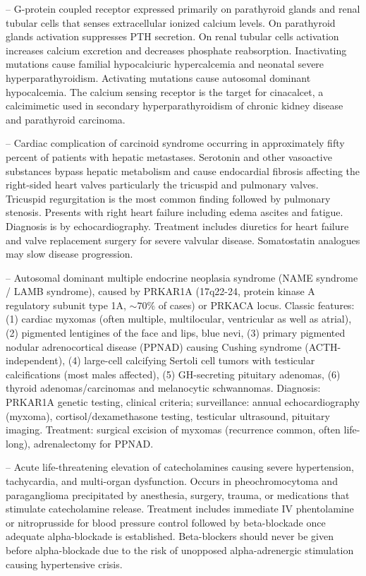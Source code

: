 -- G-protein coupled receptor expressed primarily on parathyroid glands and renal tubular cells that senses extracellular ionized calcium levels. On parathyroid glands activation suppresses PTH secretion. On renal tubular cells activation increases calcium excretion and decreases phosphate reabsorption. Inactivating mutations cause familial hypocalciuric hypercalcemia and neonatal severe hyperparathyroidism. Activating mutations cause autosomal dominant hypocalcemia. The calcium sensing receptor is the target for cinacalcet, a calcimimetic used in secondary hyperparathyroidism of chronic kidney disease and parathyroid carcinoma.

-- Cardiac complication of carcinoid syndrome occurring in approximately fifty percent of patients with hepatic metastases. Serotonin and other vasoactive substances bypass hepatic metabolism and cause endocardial fibrosis affecting the right-sided heart valves particularly the tricuspid and pulmonary valves. Tricuspid regurgitation is the most common finding followed by pulmonary stenosis. Presents with right heart failure including edema ascites and fatigue. Diagnosis is by echocardiography. Treatment includes diuretics for heart failure and valve replacement surgery for severe valvular disease. Somatostatin analogues may slow disease progression.

-- Autosomal dominant multiple endocrine neoplasia syndrome (NAME syndrome / LAMB syndrome), caused by PRKAR1A (17q22-24, protein kinase A regulatory subunit type 1A, $\sim 70\%$ of cases) or PRKACA locus. Classic features: (1) cardiac myxomas (often multiple, multilocular, ventricular as well as atrial), (2) pigmented lentigines of the face and lips, blue nevi, (3) primary pigmented nodular adrenocortical disease (PPNAD) causing Cushing syndrome (ACTH-independent), (4) large-cell calcifying Sertoli cell tumors with testicular calcifications (most males affected), (5) GH-secreting pituitary adenomas, (6) thyroid adenomas/carcinomas and melanocytic schwannomas. Diagnosis: PRKAR1A genetic testing, clinical criteria; surveillance: annual echocardiography (myxoma), cortisol/dexamethasone testing, testicular ultrasound, pituitary imaging. Treatment: surgical excision of myxomas (recurrence common, often life-long), adrenalectomy for PPNAD.

-- Acute life-threatening elevation of catecholamines causing severe hypertension, tachycardia, and multi-organ dysfunction. Occurs in pheochromocytoma and paraganglioma precipitated by anesthesia, surgery, trauma, or medications that stimulate catecholamine release. Treatment includes immediate IV phentolamine or nitroprusside for blood pressure control followed by beta-blockade once adequate alpha-blockade is established. Beta-blockers should never be given before alpha-blockade due to the risk of unopposed alpha-adrenergic stimulation causing hypertensive crisis.


